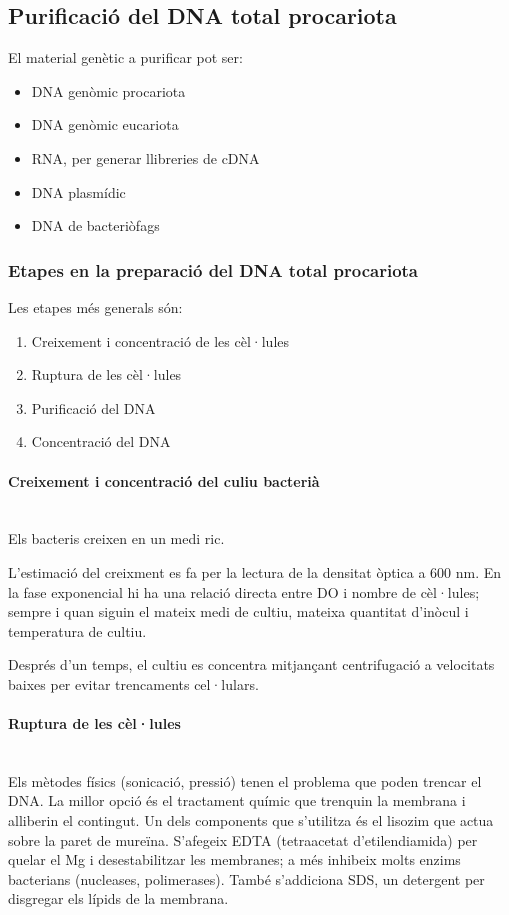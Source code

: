 \subsection{Purificació del DNA total procariota}
El material genètic a purificar pot ser:
\begin{itemize}
\item DNA genòmic procariota
\item DNA genòmic eucariota
\item RNA, per generar llibreries de cDNA
\item DNA plasmídic
\item DNA de bacteriòfags 
\end{itemize}

\subsubsection{Etapes en la preparació del DNA total procariota}
Les etapes més generals són:
\begin{enumerate}
\item Creixement i concentració de les cèl·lules
\item Ruptura de les cèl·lules
\item Purificació del DNA
\item Concentració del DNA
\end{enumerate}

\paragraph{Creixement i concentració del culiu bacterià} \hfill \\
Els bacteris creixen en un medi ric.

L'estimació del creixment es fa per la lectura de la densitat
òptica a 600 nm. En la fase exponencial hi ha una relació directa entre DO i
nombre de cèl·lules; sempre i quan siguin el mateix medi de cultiu,
mateixa quantitat d'inòcul i temperatura de cultiu.

Després d'un temps, el cultiu es concentra mitjançant centrifugació a
velocitats baixes per evitar trencaments cel·lulars.

\paragraph{Ruptura de les cèl·lules} \hfill \\
Els mètodes físics (sonicació, pressió) tenen el problema que poden
trencar el DNA. La millor opció és el tractament químic que trenquin
la membrana i alliberin el contingut. Un dels components que
s'utilitza és el lisozim que actua sobre la paret de
mureïna. S'afegeix EDTA (tetraacetat d'etilendiamida) per quelar el Mg i desestabilitzar les
membranes; a més inhibeix molts enzims bacterians (nucleases,
polimerases). També s'addiciona SDS, un detergent per disgregar els
lípids de la membrana.

